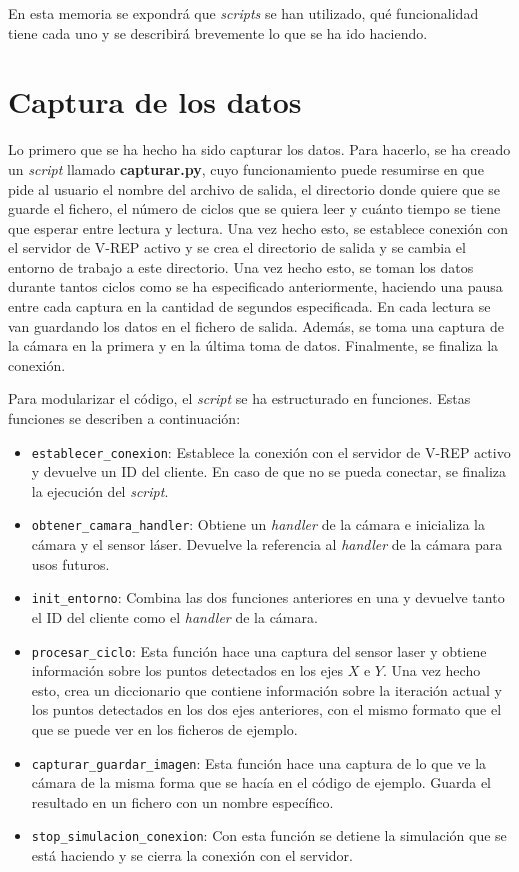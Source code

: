 \documentclass[11pt,a4paper]{article}
\begin{document}
En esta memoria se expondrá que \textit{scripts} se han utilizado, qué funcionalidad tiene cada
uno y se describirá brevemente lo que se ha ido haciendo.

\section{Captura de los datos}

Lo primero que se ha hecho ha sido capturar los datos. Para hacerlo, se ha creado un
\textit{script} llamado \textbf{capturar.py}, cuyo funcionamiento puede resumirse en
que pide al usuario el nombre del archivo de salida, el directorio donde quiere que
se guarde el fichero, el número de ciclos que se quiera leer y cuánto tiempo se tiene
que esperar entre lectura y lectura. Una vez hecho esto, se establece conexión
con el servidor de V-REP activo y se crea el directorio de salida y se cambia
el entorno de trabajo a este directorio. Una vez hecho esto, se toman los datos durante
tantos ciclos como se ha especificado anteriormente, haciendo una pausa entre cada captura
en la cantidad de segundos especificada. En cada lectura se van guardando los datos en el
fichero de salida. Además, se toma una captura de la cámara en la primera y en la última toma
de datos. Finalmente, se finaliza la conexión.

Para modularizar el código, el \textit{script} se ha estructurado en funciones. Estas
funciones se describen a continuación:

\begin{itemize}[label=\textbullet]
	\item \texttt{establecer\_conexion}: Establece la conexión con el servidor
	de V-REP activo y devuelve un ID del cliente. En caso de que no se pueda conectar,
	se finaliza la ejecución del \textit{script}.
	\item \texttt{obtener\_camara\_handler}: Obtiene un \textit{handler} de la cámara
	e inicializa la cámara y el sensor láser. Devuelve la referencia al \textit{handler}
	de la cámara para usos futuros.
	\item \texttt{init\_entorno}: Combina las dos funciones anteriores en una y devuelve
	tanto el ID del cliente como el \textit{handler} de la cámara.
	\item \texttt{procesar\_ciclo}: Esta función hace una captura del sensor laser y obtiene
	información sobre los puntos detectados en los ejes $X$ e $Y$. Una vez hecho esto, crea
	un diccionario que contiene información sobre la iteración actual y los puntos detectados
	en los dos ejes anteriores, con el mismo formato que el que se puede ver en los ficheros
	de ejemplo.
	\item \texttt{capturar\_guardar\_imagen}: Esta función hace una captura de lo que ve la
	cámara de la misma forma que se hacía en el código de ejemplo. Guarda el resultado
	en un fichero con un nombre específico.
	\item \texttt{stop\_simulacion\_conexion}: Con esta función se detiene la simulación
	que se está haciendo y se cierra la conexión con el servidor.
\end{itemize}
\end{document}
